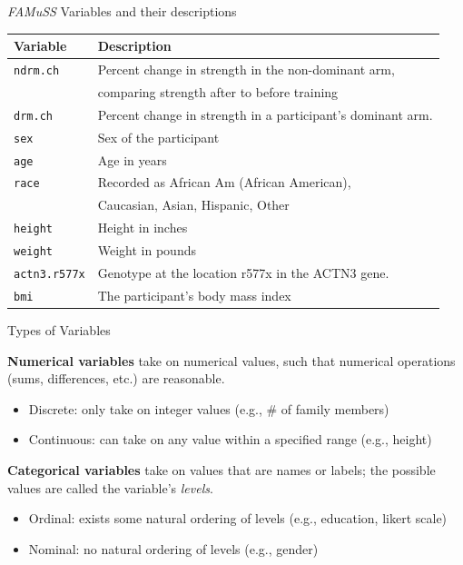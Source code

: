 \documentclass[10pt,handout]{beamer}\usepackage[]{graphicx}\usepackage[]{color}
\begin{document}
\begin{frame}{\emph{FAMuSS} Variables and their descriptions}
	\protect\hypertarget{famuss-variables-and-their-descriptions}{}
	
	\begin{center}
		\begin{tabular}{ll}
			{\bf Variable} & {\bf Description} \\
\hline 
\texttt{ndrm.ch} & Percent change in strength in the non-dominant arm, \\
& comparing strength after to before training \\
\texttt{drm.ch} & Percent change in strength in a participant's dominant arm.\\
			\texttt{sex} & Sex of the participant \\
			\texttt{age} & Age in years   \\
			\texttt{race} & Recorded as African Am (African American),\\
			& Caucasian, Asian, Hispanic, Other \\
			\texttt{height} & Height in inches    \\
			\texttt{weight} & Weight in pounds  \\
			\texttt{actn3.r577x} & Genotype at the location r577x in the ACTN3 gene. \\
			\texttt{bmi} & The participant's body mass index 
		\end{tabular}
	\end{center}
	
\end{frame}

\begin{frame}{Types of Variables}
	\protect\hypertarget{types-of-variables}{}
	
	\textbf{Numerical variables} take on numerical values, such that
	numerical operations (sums, differences, etc.) are reasonable.
	
	\begin{itemize}
		\item
		Discrete: only take on integer values (e.g., \# of family members)
		\item
		Continuous: can take on any value within a specified range (e.g.,
		height)
	\end{itemize}
	
	\pause
	
	\textbf{Categorical variables} take on values that are names or labels;
	the possible values are called the variable's \emph{levels}.
	
	\begin{itemize}
		\tightlist
		\item
		Ordinal: exists some natural ordering of levels (e.g., education, likert scale)
		\item
		Nominal: no natural ordering of levels (e.g., gender)
	\end{itemize}
	
\end{frame}
\end{document}
